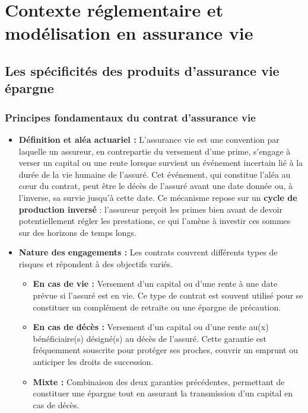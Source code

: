 \chapter{Contexte réglementaire et modélisation en assurance vie}
\label{chap:contexte}

\section{Les spécificités des produits d'assurance vie épargne}
\label{sec:spec_av}

\subsection{Principes fondamentaux du contrat d'assurance vie}
\begin{itemize}
    \item \textbf{Définition et aléa actuariel :} L'assurance vie est une convention par laquelle un assureur, en contrepartie du versement d'une prime, s'engage à verser un capital ou une rente lorsque survient un événement incertain lié à la durée de la vie humaine de l'assuré. \newline{}
    Cet événement, qui constitue l'aléa au cœur du contrat, peut être le décès de l'assuré avant une date donnée ou, à l'inverse, sa survie jusqu'à cette date. \newline{}
    Ce mécanisme repose sur un \textbf{cycle de production inversé} : l'assureur perçoit les primes bien avant de devoir potentiellement régler les prestations, ce qui l'amène à investir ces sommes sur des horizons de temps longs.

    \item \textbf{Nature des engagements :} Les contrats couvrent différents types de risques et répondent à des objectifs variés.
    \begin{itemize}
        \item \textbf{En cas de vie :} Versement d'un capital ou d'une rente à une date prévue si l'assuré est en vie. Ce type de contrat est souvent utilisé pour se constituer un complément de retraite ou une épargne de précaution.
        \item \textbf{En cas de décès :} Versement d'un capital ou d'une rente au(x) bénéficiaire(s) désigné(s) au décès de l'assuré. Cette garantie est fréquemment souscrite pour protéger ses proches, couvrir un emprunt ou anticiper les droits de succession.
        \item \textbf{Mixte :} Combinaison des deux garanties précédentes, permettant de constituer une épargne tout en assurant la transmission d'un capital en cas de décès.
    \end{itemize}


\end{itemize}

